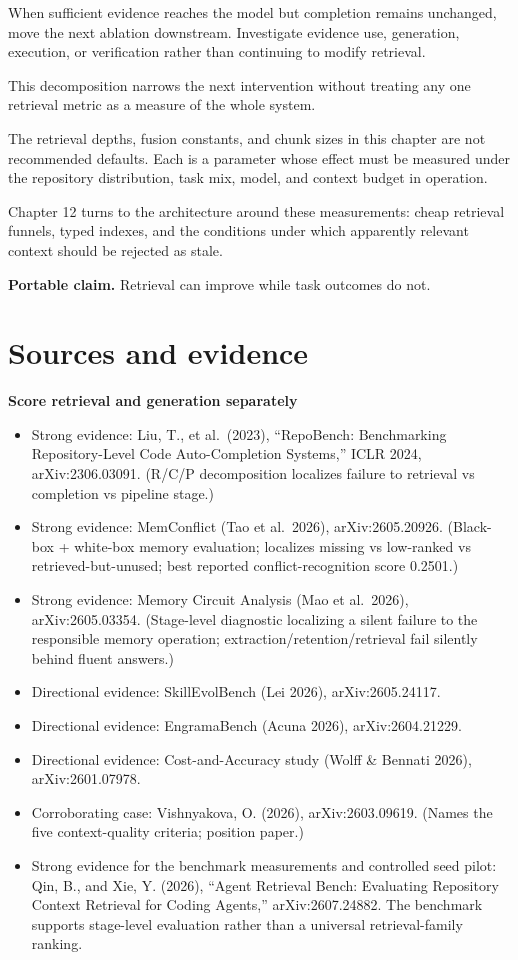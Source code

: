 When sufficient evidence reaches the model but completion remains unchanged, move the next ablation downstream. Investigate evidence use, generation, execution, or verification rather than continuing to modify retrieval.

This decomposition narrows the next intervention without treating any one retrieval metric as a measure of the whole system.

The retrieval depths, fusion constants, and chunk sizes in this chapter are not recommended defaults. Each is a parameter whose effect must be measured under the repository distribution, task mix, model, and context budget in operation.

Chapter 12 turns to the architecture around these measurements: cheap retrieval funnels, typed indexes, and the conditions under which apparently relevant context should be rejected as stale.

\textbf{Portable claim.} Retrieval can improve while task outcomes do not.

\section*{Sources and evidence}

\textbf{Score retrieval and generation separately}

\begin{itemize}
\tightlist
\item
  Strong evidence: Liu, T., et al.~(2023), ``RepoBench: Benchmarking Repository-Level Code Auto-Completion Systems,'' ICLR 2024, arXiv:2306.03091. (R/C/P decomposition localizes failure to retrieval vs completion vs pipeline stage.)
\item
  Strong evidence: MemConflict (Tao et al.~2026), arXiv:2605.20926. (Black-box + white-box memory evaluation; localizes missing vs low-ranked vs retrieved-but-unused; best reported conflict-recognition score 0.2501.)
\item
  Strong evidence: Memory Circuit Analysis (Mao et al.~2026), arXiv:2605.03354. (Stage-level diagnostic localizing a silent failure to the responsible memory operation; extraction/retention/retrieval fail silently behind fluent answers.)
\item
  Directional evidence: SkillEvolBench (Lei 2026), arXiv:2605.24117.
\item
  Directional evidence: EngramaBench (Acuna 2026), arXiv:2604.21229.
\item
  Directional evidence: Cost-and-Accuracy study (Wolff \& Bennati 2026), arXiv:2601.07978.
\item
  Corroborating case: Vishnyakova, O. (2026), arXiv:2603.09619. (Names the five context-quality criteria; position paper.)
\item
  Strong evidence for the benchmark measurements and controlled seed pilot: Qin, B., and Xie, Y. (2026), ``Agent Retrieval Bench: Evaluating Repository Context Retrieval for Coding Agents,'' arXiv:2607.24882. The benchmark supports stage-level evaluation rather than a universal retrieval-family ranking.
\end{itemize}

